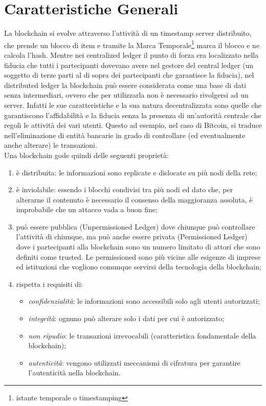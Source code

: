 \section{Caratteristiche Generali}
%
La blockchain si evolve attraverso l'attività di un timestamp server distribuito, che prende un blocco di item e tramite la Marca Temporale\footnote{istante temporale o timestamping} marca il blocco e ne calcola l'hash. Mentre nei centralized ledger il punto di forza era localizzato nella fiducia che tutti i partecipanti dovevano avere nel gestore del central ledger (un soggetto di terze parti al di sopra dei partecipanti che garantisce la fiducia), nel distributed ledger la blockchain può essere considerata come una base di dati senza intermediari, ovvero che per utilizzarla non è necessario rivolgersi ad un server. Infatti le sue caratteristiche e la sua natura decentralizzata sono quelle che garantiscono l'affidabilità e la fiducia senza la presenza di un’autorità centrale che regoli le attività dei vari utenti. Questo ad esempio, nel caso di Bitcoin, si traduce nell'eliminazione di entità bancarie in grado di controllare (ed eventualmente anche alterare) le transazioni. \\
Una blockchain gode quindi delle seguenti proprietà:
\begin{enumerate}
	\item è distribuita: le informazioni sono replicate e dislocate su più nodi della rete;
	\item è inviolabile: essendo i blocchi condivisi tra più nodi ed dato che, per alterarne il contenuto è necessario il consenso della maggioranza assoluta, è improbabile che un attacco vada a buon fine;
	\item può essere pubblica (Unpermissioned Ledger) dove chiunque può controllare l'attività di chiunque, ma può anche essere privata (Permissioned Ledger) dove i partecipanti alla blockchain sono un numero limitato di attori che sono definiti come trusted. Le \gls{permissioned} sono più vicine alle esigenze di imprese ed istituzioni che vogliono comunque servirsi della tecnologia della blockchain;
	\item rispetta i requisiti di:
	      \begin{itemize}
	      	\item \emph{confidenzialità}: le informazioni sono accessibili solo agli utenti autorizzati;
	      	\item \emph{integrità}: ognuno può alterare solo i dati per cui è autorizzato;
	      	\item \emph{non ripudio}: le transazioni irrevocabili (caratteristica fondamentale della blockchain);
	      	\item \emph{autenticità}: vengono utilizzati meccanismi di cifratura per garantire l'autenticità nella blockchain.
	      \end{itemize}%
\end{enumerate}
%
